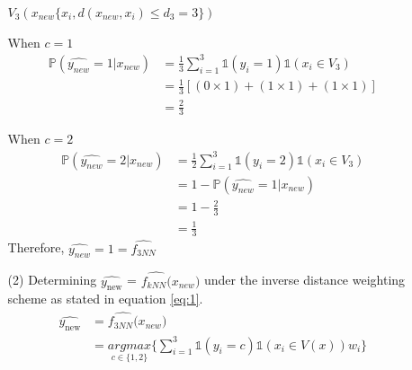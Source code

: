 \documentclass[12pt,a4paper]{article}
\begin{document}
\begin{enumerate}
\begin{enumerate}
$V_3(x_{new}  \{ x_i, d(x_{new},x_i ) \leq d_3  = 3  \})   $

When $c = 1$
\begin{align*}
		\mathbb{P}(\widehat{y_{new}}  = 1 | x_{new}) &= \frac{1}{3} \sum_{i = 1}^3  \mathbb{1}(y_i  = 1)   \mathbb{1}(x_i \in V_3)  \\
		&= \frac{1}{3} [ (0 \times 1) +  (1 \times 1)  + (1  \times 1) ]   \\
		&=  \frac{2}{3}
\end{align*}

When $c = 2$
\begin{align*}
		\mathbb{P}(\widehat{y_{new}}  = 2| x_{new}) &= \frac{1}{2} \sum_{i = 1}^3  \mathbb{1}(y_i  = 2)   \mathbb{1}(x_i \in V_3)  \\
		&= 1-  	\mathbb{P}(\widehat{y_{new}}  = 1| x_{new})    \\
		&=  1 -   \frac{2}{3} \\
		&=  \frac{1}{3}
\end{align*}
Therefore, $ \widehat{y_{new}} = 1 =  \widehat{f_{3NN}} $ 

	\item[(2)]Determining  $\widehat{y_{\text{new}}}$ = $\widehat{f_{kNN}(}x_{new})$  under the inverse distance weighting scheme as stated in equation \eqref{eq:1}.
\begin{align*}
		\widehat{y_{\text{new}}} &=  \widehat{f_{3NN}(}x_{new})\\		
		&= \underset{c \in \{1,2\}} {argmax}  \{  \sum_{i = 1}^3  \mathbb{1}(y_i  = c)   \mathbb{1}(x_i \in V(x)) w_i   \}
\end{align*}	


\end{enumerate}
\end{enumerate}
\end{document}
